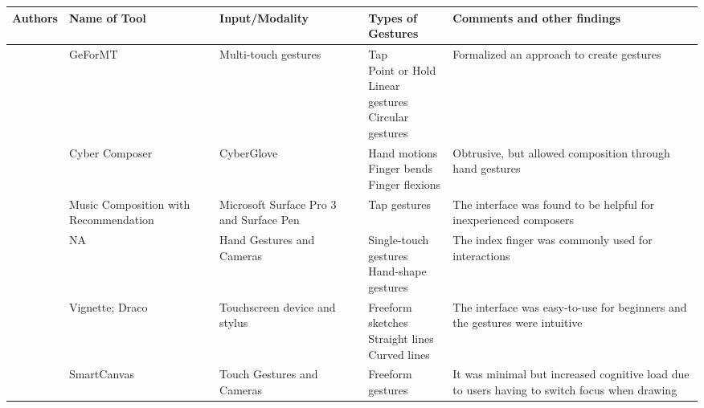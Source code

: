 \begin{landscape} %
\begin{table} [!htbp]  
\label{tab:rsogi}        
   \vspace{0.20cm}    
        \begin{tabular}{|p{2cm}|p{2.5cm}|p{3cm}| p{4cm}| p{4cm} | } %
        \hline 
       Authors & Name of Tool & Input/Modality & Types of Gestures & Comments and other findings \\ \hline
       
       \citet{kammer2010towards} & GeForMT & Multi-touch gestures & \makecell[tl]{Tap \\ Point or Hold \\ Linear gestures\\ Circular gestures} & Formalized an approach to create gestures \\ \hline
       
       
       \citet{ip2005cyber} & Cyber Composer & CyberGlove & \makecell[tl]{Hand motions \\ Finger bends \\ Finger flexions} & Obtrusive, but allowed composition through hand gestures \\ \hline
       
       \citet{kikuchi2016music} & Music Composition with Recommendation & Microsoft Surface Pro 3 and Surface Pen & Tap gestures & The interface was found to be helpful for inexperienced composers \\ \hline
       
       \citet{epps2006a} & NA & Hand Gestures and Cameras & \makecell[tl]{Single-touch gestures \\ Hand-shape gestures} & The index finger was commonly used for interactions \\ \hline
       
       \citet{kazi2012vignette,kazi2014draco} & Vignette; Draco & Touchscreen device and stylus & \makecell[tl]{Freeform sketches \\ Straight lines \\ Curved lines} & The interface was easy-to-use for beginners and the gestures were intuitive \\ \hline
       
       \citet{mo2005smartcanvas} & SmartCanvas & Touch Gestures and Cameras & Freeform gestures & It was minimal but increased cognitive load due to users having to switch focus when drawing \\ \hline 
       
        \end{tabular}
\end{table}
\end{landscape}

\newpage















